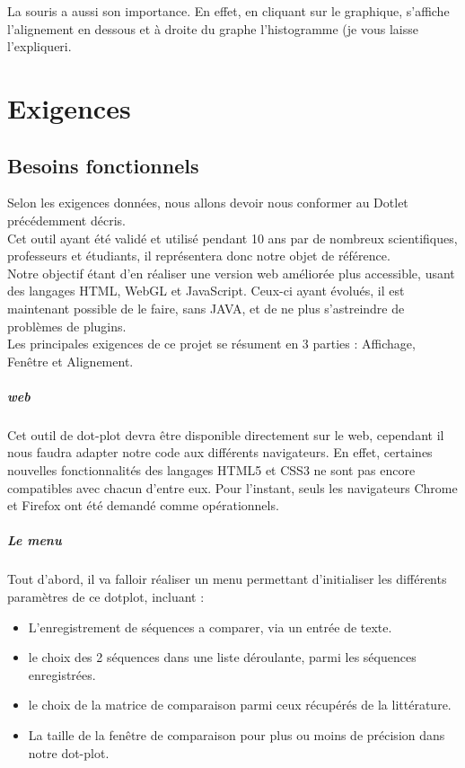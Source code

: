 \documentclass{report}
\begin{document}
La souris a aussi son importance. En effet, en cliquant sur le graphique, s'affiche l'alignement en dessous et à droite du graphe l'histogramme (je vous laisse l'expliquer^^).\\


\chapter{Exigences}
\section{Besoins fonctionnels}
Selon les exigences données, nous allons devoir nous conformer au Dotlet précédemment décris.\\
Cet outil ayant été validé et utilisé pendant 10 ans par de nombreux scientifiques, professeurs et étudiants, il représentera donc notre objet de référence.\\
Notre objectif étant d'en réaliser une version web améliorée plus accessible, usant des langages HTML, WebGL et JavaScript. Ceux-ci ayant évolués, il est maintenant possible de le faire, sans JAVA, et de ne plus s'astreindre de problèmes de plugins.\\

Les principales exigences de ce projet se résument en 3 parties : Affichage, Fenêtre et Alignement.

\paragraph{web}

Cet outil de dot-plot devra être disponible directement sur le web, cependant il nous faudra adapter notre code aux différents navigateurs. En effet, certaines nouvelles fonctionnalités des langages HTML5 et CSS3 ne sont pas encore compatibles avec chacun d'entre eux.
Pour l'instant, seuls les navigateurs Chrome et Firefox ont été demandé comme opérationnels.

\paragraph{Le menu}
	
Tout d'abord, il va falloir réaliser un menu permettant d'initialiser les différents paramètres de ce dotplot, incluant :
\begin{itemize}
	\item L'enregistrement de séquences a comparer, via un entrée de texte.
	\item le choix des 2 séquences dans une liste déroulante, parmi les séquences enregistrées.
	\item le choix de la matrice de comparaison parmi ceux récupérés de la littérature.
	\item La taille de la fenêtre de comparaison pour plus ou moins de précision dans notre dot-plot.
\end{itemize}
\end{document}
